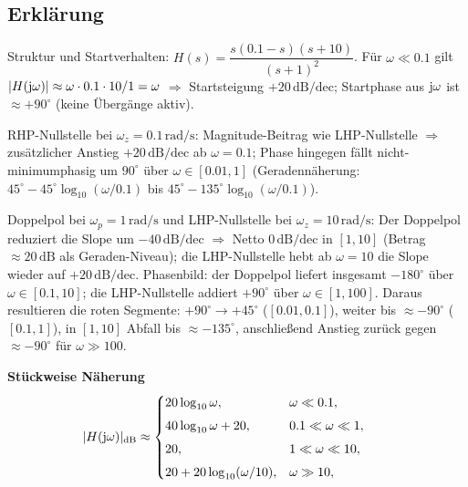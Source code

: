 \subsection{Erklärung}
\vspace{5mm}
\begin{description}[leftmargin=1.2em,labelsep=.6em,font=\bfseries]
\item[Schritt 1] Struktur und Startverhalten: $H(s)=\dfrac{s(0.1-s)(s+10)}{(s+1)^2}$. Für $\omega\ll0.1$ gilt $|H(\operatorname{j}\!\omega)|\approx \omega\cdot 0.1\cdot 10/1=\omega$ $\Rightarrow$ Startsteigung $+20\,\mathrm{dB/dec}$; Startphase aus $\operatorname{j}\!\omega$ ist $\approx+90^\circ$ (keine Übergänge aktiv).
\item[Schritt 2] RHP-Nullstelle bei $\omega_z=0.1\,\mathrm{rad/s}$: Magnitude-Beitrag wie LHP-Nullstelle $\Rightarrow$ zusätzlicher Anstieg $+20\,\mathrm{dB/dec}$ ab $\omega=0.1$; Phase hingegen fällt nicht-minimumphasig um $90^\circ$ über $\omega\in[0.01,1]$ (Geradennäherung: $45^\circ-45^\circ\log_{10}(\omega/0.1)$ bis $45^\circ-135^\circ\log_{10}(\omega/0.1)$).
\item[Schritt 3] Doppelpol bei $\omega_p=1\,\mathrm{rad/s}$ und LHP-Nullstelle bei $\omega_z=10\,\mathrm{rad/s}$: Der Doppelpol reduziert die Slope um $-40\,\mathrm{dB/dec}$ $\Rightarrow$ Netto $0\,\mathrm{dB/dec}$ in $[1,10]$ (Betrag $\approx20\,\mathrm{dB}$ als Geraden-Niveau); die LHP-Nullstelle hebt ab $\omega=10$ die Slope wieder auf $+20\,\mathrm{dB/dec}$. Phasenbild: der Doppelpol liefert insgesamt $-180^\circ$ über $\omega\in[0.1,10]$; die LHP-Nullstelle addiert $+90^\circ$ über $\omega\in[1,100]$. Daraus resultieren die roten Segmente: $+90^\circ\to+45^\circ$ ($[0.01,0.1]$), weiter bis $\approx-90^\circ$ ($[0.1,1]$), in $[1,10]$ Abfall bis $\approx-135^\circ$, anschließend Anstieg zurück gegen $\approx-90^\circ$ für $\omega\gg100$.
\end{description}

\vspace{0.5cm}
\medskip
\noindent\textbf{Stückweise Näherung}
\[
|H(\operatorname{j}\!\omega)|_{\mathrm{dB}}\approx
\begin{cases}
20\log_{10}\omega,& \omega\ll0.1,\\[4pt]
40\log_{10}\omega+20,& 0.1\ll\omega\ll1,\\[4pt]
20,& 1\ll\omega\ll10,\\[4pt]
20+20\log_{10}(\omega/10),& \omega\gg10,
\end{cases}
\qquad
\]
\newpage
